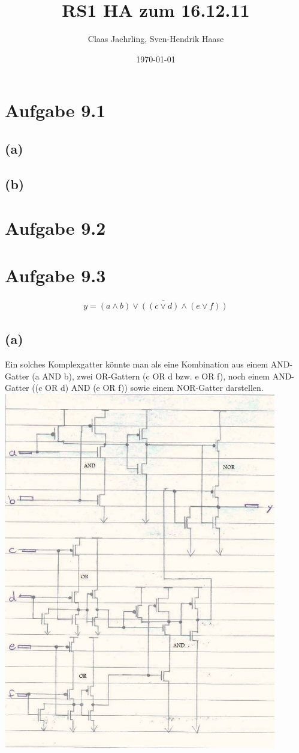 \documentclass[12pt]{article}
\author{Claas Jaehrling, Sven-Hendrik Haase}
\title{RS1 HA zum 16.12.11}
\date{\today}
\begin{document}
\setcounter{secnumdepth}{0}
\maketitle

\section{Aufgabe 9.1}
\subsection{(a)}
\subsection{(b)}

\section{Aufgabe 9.2}

\section{Aufgabe 9.3}
\begin{align}
y = \overline{(a \land b) \lor ((c \lor d) \land (e \lor f))}
\end{align}
\subsection{(a)}
Ein solches Komplexgatter könnte man als eine Kombination aus einem
AND-Gatter (a AND b), zwei OR-Gattern (c OR d bzw. e OR f), noch
einem AND-Gatter ((c OR d) AND (e OR f)) sowie einem NOR-Gatter
darstellen.
\includegraphics{Schaltskizze93a}
\end{document}
